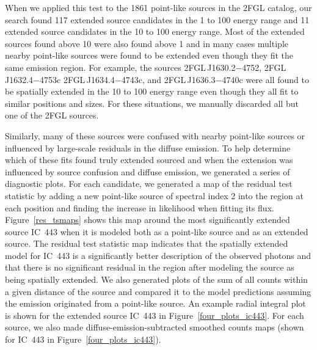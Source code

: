 \documentclass[12pt,preprint]{aastex}
\newcommand{\gev}{\text{GeV}\xspace}
\begin{document}
When we applied this test to the 1861 point-like sources in the 2FGL catalog, our
search found 117 extended source candidates in the 1 \gev to 100 \gev
energy range and 11 extended source candidates in the 10 \gev to 100
\gev energy range. Most of the extended sources found above 10 \gev were
also found above 1 \gev and in many cases multiple nearby point-like
sources were found to be extended even though they fit the same emission region.
For example, the sources 2FGL\,J1630.2$-$4752, 2FGL\,J1632.4$-$4753c 2FGL\,J1634.4$-$4743c,
and 2FGL\,J1636.3$-$4740c were all found to be spatially extended in the
10 \gev to 100 \gev energy range even though they all fit to similar
positions and sizes.  For these situations, we manually discarded all
but one of the 2FGL sources.

Similarly, many of these sources were confused with nearby
point-like sources or influenced by large-scale residuals in the
diffuse emission.  To help determine which of these fits found
truly extended sourced and when the extension was
influenced by source confusion and diffuse emission, we generated a
series of diagnostic plots.  For each candidate, we generated a map
of the residual test statistic by adding a new point-like source of spectral index 2 into the
region at each position and finding the increase in likelihood when fitting
its flux. Figure~\ref{res_tsmaps} shows this map around the
most significantly extended source IC~443 when it is modeled both as a
point-like source and as an extended source.  The residual test statistic
map indicates
that the spatially extended model for IC~443 is a significantly better
description of the observed photons and that there is no significant
residual in the region after modeling the source as being spatially extended.
We also generated plots of the sum of all counts within a given distance of
the source and compared it to the model predictions assuming the emission
originated from a point-like source.  An example radial integral plot
is shown for the extended source IC~443 in Figure~\ref{four_plots_ic443}.
For each source, we also made diffuse-emission-subtracted smoothed counts
maps (shown for IC~443 in Figure~\ref{four_plots_ic443}).
\end{document}
